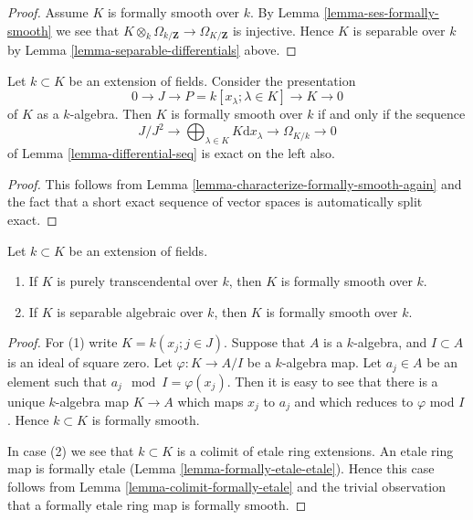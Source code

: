 \begin{proof}
Assume $K$ is formally smooth over $k$.
By Lemma \ref{lemma-ses-formally-smooth} we see that
$K \otimes_k \Omega_{k/\mathbf{Z}} \to \Omega_{K/\mathbf{Z}}$
is injective. Hence $K$ is separable over $k$ by
Lemma \ref{lemma-separable-differentials} above.
\end{proof}

\begin{lemma}
\label{lemma-characterize-formally-smooth-field-extension}
Let $k \subset K$ be an extension of fields.
Consider the presentation
$$
0 \longrightarrow J \longrightarrow
P = k[x_\lambda; \lambda \in K] \longrightarrow K
\longrightarrow 0
$$
of $K$ as a $k$-algebra. Then $K$ is formally smooth over $k$
if and only if the sequence
$$
J/J^2 \to
\bigoplus\nolimits_{\lambda \in K} K\text{d}x_\lambda \to
\Omega_{K/k} \to 0
$$
of Lemma \ref{lemma-differential-seq} is exact on the left also.
\end{lemma}

\begin{proof}
This follows from Lemma \ref{lemma-characterize-formally-smooth-again}
and the fact that a short exact sequence
of vector spaces is automatically split exact.
\end{proof}

\begin{lemma}
\label{lemma-formally-smooth-extensions-easy}
Let $k \subset K$ be an extension of fields.
\begin{enumerate}
\item If $K$ is purely transcendental over $k$, then
$K$ is formally smooth over $k$.
\item If $K$ is separable algebraic over $k$, then $K$ is
formally smooth over $k$.
\end{enumerate}
\end{lemma}

\begin{proof}
For (1) write $K = k(x_j; j \in J)$. Suppose that
$A$ is a $k$-algebra, and $I \subset A$ is an ideal of
square zero. Let $\varphi : K \to A/I$ be a $k$-algebra map.
Let $a_j \in A$ be an element such that $a_j \mod I = \varphi(x_j)$.
Then it is easy to see that there is a unique $k$-algebra
map $K \to A$ which maps $x_j$ to $a_j$ and which reduces
to $\varphi$ mod $I$. Hence $k \subset K$ is formally smooth.

\medskip\noindent
In case (2) we see that $k \subset K$ is a colimit of
etale ring extensions. An etale ring map is formally etale
(Lemma \ref{lemma-formally-etale-etale}). Hence this case follows from
Lemma \ref{lemma-colimit-formally-etale} and the trivial observation
that a formally etale ring map is formally smooth.
\end{proof}

